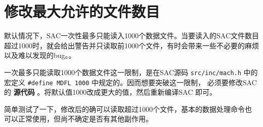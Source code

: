 \section{修改最大允许的文件数目}
\label{sec:mdfl}
默认情况下，SAC一次性最多只能读入1000个数据文件。当要读入的SAC文件数目
超过1000时，就会给出警告并只读取前1000个文件，有时会带来一些不必要的麻烦
以及难以发现的bug。。

一次最多只能读取1000个数据文件这一限制，是在SAC源码 \verb|src/inc/mach.h|
中的宏定义 \verb|#define MDFL 1000| 中规定的。因而想要突破这一限制，
必须要修改SAC的 \textbf{源代码} 。将默认值1000改成更大的值，然后重新编译SAC
即可。

简单测试了一下，修改后的确可以读取超过1000个文件，基本的数据处理命令也
可以正常使用，但尚不确定是否有其他副作用。
